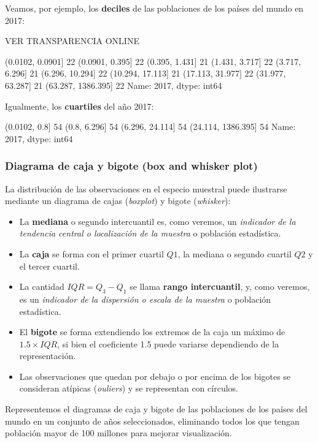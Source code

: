 \documentclass[11pt]{article}
\providecommand{\tightlist}{%
      \setlength{\itemsep}{0pt}\setlength{\parskip}{0pt}}
\begin{document}
    Veamos, por ejemplo, los \textbf{deciles} de las poblaciones de los
países del mundo en 2017:

VER TRANSPARENCIA ONLINE

(0.0102, 0.0901]      22
(0.0901, 0.395]       22
(0.395, 1.431]        21
(1.431, 3.717]        22
(3.717, 6.296]        21
(6.296, 10.294]       22
(10.294, 17.113]      21
(17.113, 31.977]      22
(31.977, 63.287]      21
(63.287, 1386.395]    22
Name: 2017, dtype: int64
            
    Igualmente, los \textbf{cuartiles} del año 2017:

(0.0102, 0.8]         54
(0.8, 6.296]          54
(6.296, 24.114]       54
(24.114, 1386.395]    54
Name: 2017, dtype: int64
            
    \subsubsection*{Diagrama de caja y bigote (box and whisker
plot)}\label{diagrama-de-caja-y-bigote-box-and-whisker-plot}

La distribución de las observaciones en el especio muestral puede
ilustrarse mediante un diagrama de cajas (\emph{boxplot}) y bigote
(\emph{whisker}):

\begin{itemize}
\tightlist
\item
  La \textbf{mediana} o segundo intercuantil es, como veremos, un
  \emph{indicador de la tendencia central o localización de la muestra}
  o población estadística.
\item
  La \textbf{caja} se forma con el primer cuartil \(Q1\), la mediana o
  segundo cuartil \(Q2\) y el tercer cuartil.
\item
  La cantidad \(IQR = Q_3-Q_1\) se llama \textbf{rango intercuantil}, y,
  como veremos, es un \emph{indicador de la dispersión o escala de la
  muestra} o población estadística.
\item
  El \textbf{bigote} se forma extendiendo los extremos de la caja un
  máximo de \(1.5\times IQR\), si bien el coeficiente 1.5 puede variarse
  dependiendo de la representación.
\item
  Las observaciones que quedan por debajo o por encima de los bigotes se
  consideran atípicas (\emph{ouliers}) y se representan con círculos.
\end{itemize}

    Representemos el diagramas de caja y bigote de las poblaciones de los
países del mundo en un conjunto de años seleccionados, eliminando todos
los que tengan población mayor de 100 millones para mejorar
visualización.
\end{document}
